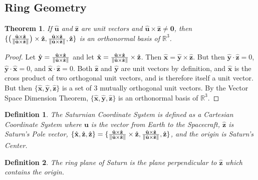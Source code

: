 \documentclass[oneside]{book}
\theoremstyle{mystyle}
\newtheorem{theorem}{Theorem}[section]
\newtheorem{definition}{Definition}[section]
\DeclarePairedDelimiter\norm{\lVert}{\rVert}
\begin{document}
\subsection{Ring Geometry}
\begin{theorem}
\label{theorem:ring_occ_geom_x_y_z_orthonormal_basis}
If $\hat{\mathbf{u}}$ and $\hat{\mathbf{z}}$ are unit vectors and $\hat{\mathbf{u}}\times \hat{\mathbf{z}} \ne \mathbf{0}$, then $\{\big(\frac{\hat{\mathbf{u}}\times \hat{\mathbf{z}}}{\norm{\hat{\mathbf{u}}\times \hat{\mathbf{z}}}}\big)\times \hat{\mathbf{z}},\frac{\hat{\mathbf{u}}\times \hat{\mathbf{z}}}{\norm{\hat{\mathbf{u}}\times \hat{\mathbf{z}}}},\hat{\mathbf{z}}\}$ is an orthonormal basis of $\mathbb{R}^3$.
\end{theorem}
\begin{proof}
Let $\hat{\mathbf{y}} = \frac{\hat{\mathbf{u}}\times \hat{\mathbf{z}}}{\norm{\hat{\mathbf{u}}\times \hat{\mathbf{z}}}}$ and let $\hat{\mathbf{x}} = \frac{\hat{\mathbf{u}}\times \hat{\mathbf{z}}}{\norm{\hat{\mathbf{u}}\times \hat{\mathbf{z}}}}\times \hat{\mathbf{z}}$. Then $\hat{\mathbf{x}} = \hat{\mathbf{y}}\times \hat{\mathbf{z}}$. But then $\hat{\mathbf{y}}\cdot \hat{\mathbf{z}} = 0$, $\hat{\mathbf{y}}\cdot \hat{\mathbf{x}} = 0$, and $\hat{\mathbf{x}}\cdot \hat{\mathbf{z}} = 0$. Both $\hat{\mathbf{z}}$ and $\hat{\mathbf{y}}$ are unit vectors by definition, and $\hat{\mathbf{x}}$ is the cross product of two orthogonal unit vectors, and is therefore itself a unit vector. But then $\{\hat{\mathbf{x}},\hat{\mathbf{y}},\hat{\mathbf{z}}\}$ is a set of $3$ mutually orthogonal unit vectors. By the Vector Space Dimension Theorem, $\{\hat{\mathbf{x}},\hat{\mathbf{y}},\hat{\mathbf{z}}\}$ is an orthonormal basis of $\mathbb{R}^3$.
\end{proof}
\begin{definition}
The Saturnian Coordinate System is defined as a Cartesian Coordinate System where $\mathbf{u}$ is the vector from Earth to the Spacecraft, $\hat{\mathbf{z}}$ is Saturn's Pole vector, $\{\hat{\mathbf{x}},\hat{\mathbf{z}},\hat{\mathbf{z}}\} = \{\frac{\hat{\mathbf{u}}\times\hat{\mathbf{z}}}{\norm{\hat{\mathbf{u}}\times\hat{\mathbf{z}}}}\times\hat{\mathbf{z}},\frac{\hat{\mathbf{u}}\times\hat{\mathbf{z}}}{\norm{\hat{\mathbf{u}}\times\hat{\mathbf{z}}}},\hat{\mathbf{z}}\}$, and the origin is Saturn's Center.
\end{definition}
\begin{definition}
The ring plane of Saturn is the plane perpendicular to $\hat{\mathbf{z}}$ which contains the origin.
\end{definition}
\end{document}
